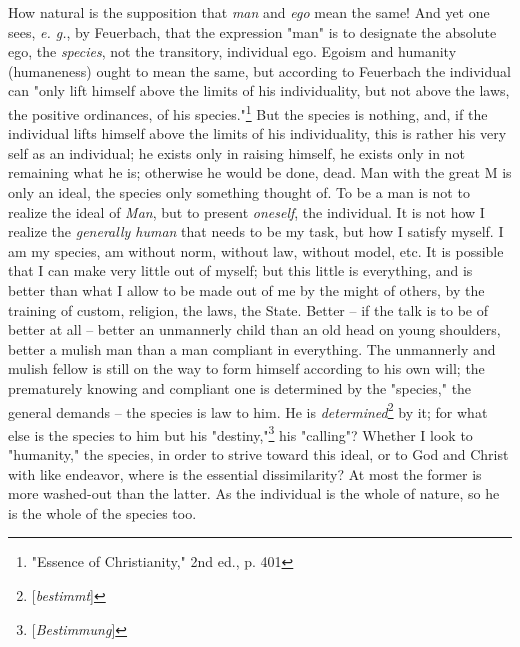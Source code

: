 \documentclass[a4paper]{book}
\begin{document}
How natural is the supposition that \textit{man} and \textit{ego} mean the 
same! And yet one sees, \textit{e. g.}, by Feuerbach, that the expression 
"{}man"{} is to designate the absolute ego, the \textit{species}, not the 
transitory, individual ego. Egoism and humanity (humaneness) ought to mean the 
same, but according to Feuerbach the individual can "{}only lift himself above 
the limits of his individuality, but not above the laws, the positive 
ordinances, of his species."{}\footnote{"{}Essence of Christianity,"{} 2nd 
ed., p. 401} But the species is nothing, and, if the individual lifts himself 
above the limits of his individuality, this is rather his very self as an 
individual; he exists only in raising himself, he exists only in not remaining 
what he is; otherwise he would be done, dead. Man with the great M is only an 
ideal, the species only something thought of. To be a man is not to realize 
the ideal of \textit{Man}, but to present \textit{oneself}, the individual. It 
is not how I realize the \textit{generally human} that needs to be my task, 
but how I satisfy myself. I am my species, am without norm, without law, 
without model, etc. It is possible that I can make very little out of myself; 
but this little is everything, and is better than what I allow to be made out 
of me by the might of others, by the training of custom, religion, the laws, 
the State. Better -- if the talk is to be of better at all -- better an 
unmannerly child than an old head on young shoulders, better a mulish man than 
a man compliant in everything. The unmannerly and mulish fellow is still on 
the way to form himself according to his own will; the prematurely knowing and 
compliant one is determined by the "{}species,"{} the general demands -- the 
species is law to him. He is \textit{determined}\footnote{[\textit{bestimmt}]} 
by it; for what else is the species to him but his 
"{}destiny,"{}\footnote{[\textit{Bestimmung}]} his "{}calling"{}? Whether I 
look to "{}humanity,"{} the species, in order to strive toward this ideal, or 
to God and Christ with like endeavor, where is the essential dissimilarity? At 
most the former is more washed-out than the latter. As the individual is the 
whole of nature, so he is the whole of the species too.
\end{document}
